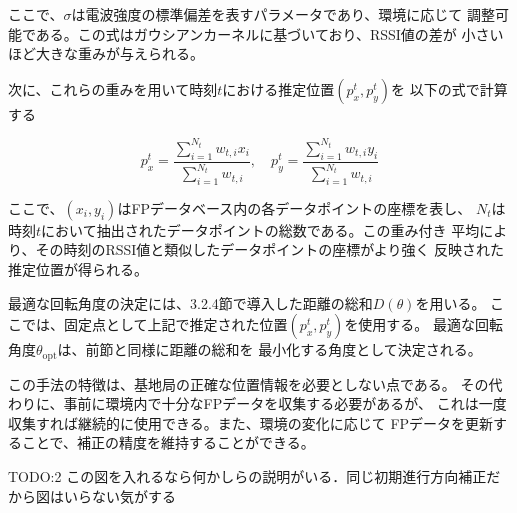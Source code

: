 ここで、$\sigma$は電波強度の標準偏差を表すパラメータであり、環境に応じて
調整可能である。この式はガウシアンカーネルに基づいており、RSSI値の差が
小さいほど大きな重みが与えられる。

次に、これらの重みを用いて時刻$t$における推定位置$(p_x^t, p_y^t)$を
以下の式で計算する

\begin{equation}
p_x^t = \frac{\sum_{i=1}^{N_t} w_{t,i} x_i}{\sum_{i=1}^{N_t} w_{t,i}}, \quad
p_y^t = \frac{\sum_{i=1}^{N_t} w_{t,i} y_i}{\sum_{i=1}^{N_t} w_{t,i}}
\end{equation}

ここで、$(x_i, y_i)$はFPデータベース内の各データポイントの座標を表し、
$N_t$は時刻$t$において抽出されたデータポイントの総数である。この重み付き
平均により、その時刻のRSSI値と類似したデータポイントの座標がより強く
反映された推定位置が得られる。

最適な回転角度の決定には、3.2.4節で導入した距離の総和$D(\theta)$を用いる。
ここでは、固定点として上記で推定された位置$(p_x^t, p_y^t)$を使用する。
最適な回転角度$\theta_{\mathrm{opt}}$は、前節と同様に距離の総和を
最小化する角度として決定される。

この手法の特徴は、基地局の正確な位置情報を必要としない点である。
その代わりに、事前に環境内で十分なFPデータを収集する必要があるが、
これは一度収集すれば継続的に使用できる。また、環境の変化に応じて
FPデータを更新することで、補正の精度を維持することができる。


TODO:2 この図を入れるなら何かしらの説明がいる．同じ初期進行方向補正だから図はいらない気がする


